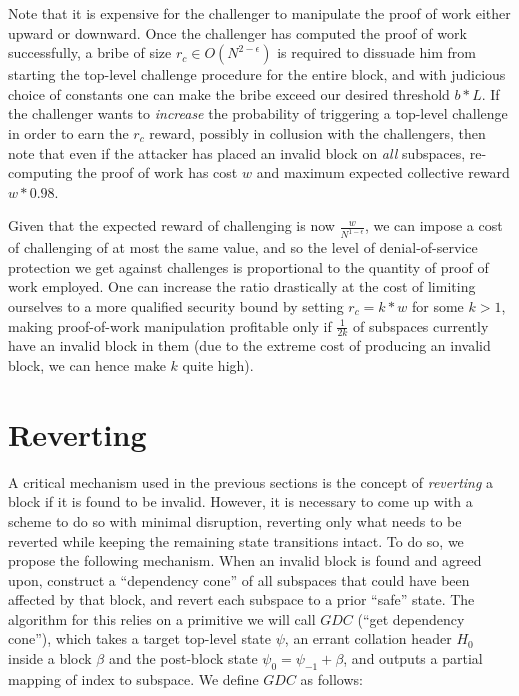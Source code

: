 \documentclass[11pt,a4paper]{article}
\theoremstyle{plain}
\theoremstyle{definition}
\theoremstyle{remark}
\begin{document}
Note that it is expensive for the challenger to manipulate the proof of work either upward or downward. Once the challenger has computed the proof of work successfully, a bribe of size $r_c \in O(N^{2-\epsilon})$ is required to dissuade him from starting the top-level challenge procedure for the entire block, and with judicious choice of constants one can make the bribe exceed our desired threshold $b * L$. If the challenger wants to \emph{increase} the probability of triggering a top-level challenge in order to earn the $r_c$ reward, possibly in collusion with the challengers, then note that even if the attacker has placed an invalid block on \emph{all} subspaces, re-computing the proof of work has cost $w$ and maximum expected collective reward $w * 0.98$.

Given that the expected reward of challenging is now $\frac{w}{N^{1-\epsilon}}$, we can impose a cost of challenging of at most the same value, and so the level of denial-of-service protection we get against challenges is proportional to the quantity of proof of work employed. One can increase the ratio drastically at the cost of limiting ourselves to a more qualified security bound by setting $r_c = k * w$ for some $k > 1$, making proof-of-work manipulation profitable only if $\frac{1}{2k}$ of subspaces currently have an invalid block in them (due to the extreme cost of producing an invalid block, we can hence make $k$ quite high).

\section{Reverting}

A critical mechanism used in the previous sections is the concept of \emph{reverting} a block if it is found to be invalid. However, it is necessary to come up with a scheme to do so with minimal disruption, reverting only what needs to be reverted while keeping the remaining state transitions intact. To do so, we propose the following mechanism. When an invalid block is found and agreed upon, construct a ``dependency cone'' of all subspaces that could have been affected by that block, and revert each subspace to a prior ``safe'' state. The algorithm for this relies on a primitive we will call $GDC$ (``get dependency cone''), which takes a target top-level state $\psi$, an errant collation header $H_0$ inside a block $\beta$ and the post-block state $\psi_0 = \psi_{-1} + \beta$, and outputs a partial mapping of index to subspace. We define $GDC$ as follows:
\end{document}
